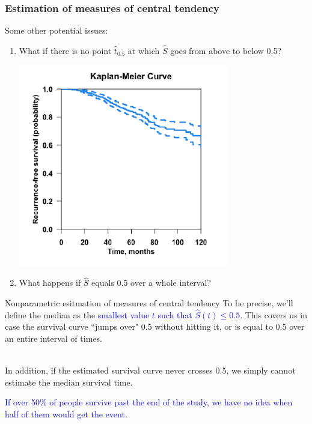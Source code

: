 \documentclass[10pt,t]{beamer}
\begin{document}
\begin{frame}
\frametitle{Estimation of measures of central tendency}

\vspace{-5 mm}

Some other potential issues: 

\medskip
\begin{enumerate}
\item What if there is no point $\hat{t}_{0.5}$ at which $\widehat{S}$ goes from above to below 0.5?
\begin{center}
	\includegraphics[width=0.6\textheight]{figs/no_median.png}
\end{center}
\item What happens if $\widehat{S}$ equals 0.5 over a whole interval?
\end{enumerate}

\end{frame}


\begin{frame}{Nonparametric esitmation of measures of central tendency}
	To be precise, we'll define the median as the \textcolor{blue}{smallest value $t$ such that $\widehat{S}(t) \leq 0.5$}. This covers us in case the survival curve ``jumps over" 0.5 without hitting it, or is equal to 0.5 over an entire interval of times. 
	\\ ~\ 
	
	In addition, if the estimated survival curve never crosses 0.5, we simply cannot estimate the median survival time. 
	
	\medskip
	
	\textcolor{blue}{If over 50\% of people survive past the end of the study, we have no idea when half of them would get the event.}
	
\end{frame}
\end{document}
